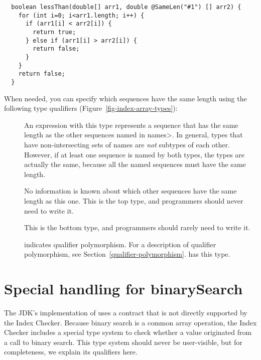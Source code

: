 \begin{Verbatim}
  boolean lessThan(double[] arr1, double @SameLen("#1") [] arr2) {
    for (int i=0; i<arr1.length; i++) {
      if (arr1[i] < arr2[i]) {
        return true;
      } else if (arr1[i] > arr2[i]) {
        return false;
      }
    }
    return false;
  }
\end{Verbatim}

When needed, you can specify which sequences have the same length using the following type qualifiers (Figure~\ref{fig-index-array-types}):

\begin{description}
\item[]
  An expression with this type represents a sequence that has the
  same length as the other sequences named in \<names>. In general,
   types that have non-intersecting sets of names
  are \textit{not} subtypes of each other. However, if at least one
  sequence is named by both types, the types are actually the same,
  because all the named sequences must have the same length.
\item[]
  No information is known about which other sequences have the same length
  as this one.
  This is the top type, and programmers should never need to write it.
\item[]
  This is the bottom type, and programmers should rarely need to write it.
\item[]
  indicates qualifier polymorphism.
  For a description of qualifier polymorphism, see
  Section~\ref{qualifier-polymorphism}.
   has this type.
\end{description}

\section{Special handling for binarySearch\label{index-searchindex}}

The JDK's implementation of
uses a contract that is not directly
supported by the Index Checker. Because binary search is a common array operation,
the Index Checker includes a special type system to check whether a value originated
from a call to binary search. This type system should never be user-visible, but for
completeness, we explain its qualifiers here.

